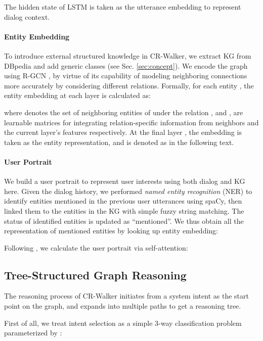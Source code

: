 \documentclass[11pt]{article}
\begin{document}
The hidden state of LSTM  is taken as the utterance embedding to represent dialog context. 

\paragraph{Entity Embedding}
To introduce external structured knowledge in CR-Walker, we extract KG from DBpedia \cite{auer2007dbpedia} and add generic classes (see Sec. \ref{sec:concept}). We encode the graph using R-GCN \cite{schlichtkrull2018modeling}, by virtue of its capability of modeling neighboring connections more accurately by considering different relations. Formally, for each entity , the entity embedding  at each layer  is calculated as:

where  denotes the set of neighboring entities of  under the relation , and , are learnable matrices for integrating relation-specific information from neighbors and the current layer's features respectively. 
At the final layer , the embedding  is taken as the entity representation, and is denoted as  in the following text. 


\paragraph{User Portrait}
We build a user portrait to represent user interests using both dialog and KG here. Given the dialog history, we performed \textit{named entity recognition} (NER) to identify entities mentioned in the previous user utterances  using spaCy, then linked them to the entities in the KG with simple fuzzy string matching. The status of identified entities is updated as ``mentioned''. We thus obtain all the representation of mentioned entities  by looking up entity embedding:

Following \citet{chen2019towards}, we calculate the user portrait  via self-attention:




 
\subsection{Tree-Structured Graph Reasoning}
The reasoning process of CR-Walker initiates from a system intent as the start point on the graph, and expands into multiple paths to get a reasoning tree. 

First of all, we treat intent selection as a simple 3-way classification problem parameterized by :
\end{document}
